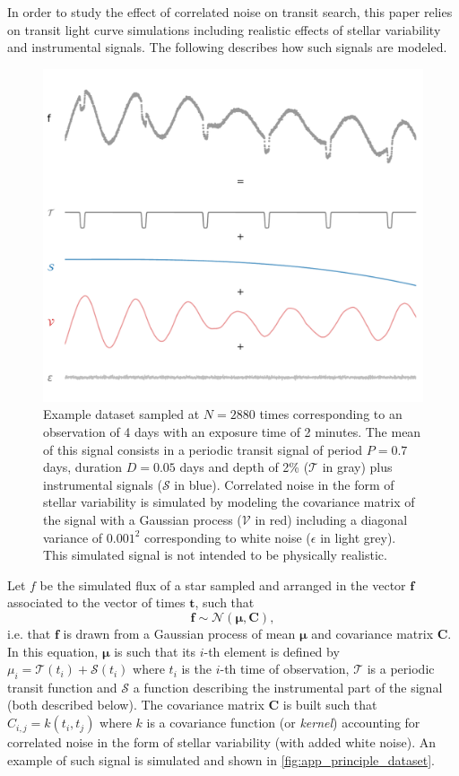 \documentclass{aastex631}
\begin{document}
In order to study the effect of correlated noise on transit search, this paper relies on transit light curve simulations including realistic effects of stellar variability and instrumental signals. The following describes how such signals are modeled.
\begin{figure}[H]
    \begin{centering}
        \includegraphics[width=0.75\linewidth]{principle_dataset_decomposed.pdf}
        \caption{Example dataset sampled at $N=2880$ times corresponding to an observation of 4 days with an exposure time of 2 minutes. The mean of this signal consists in a periodic transit signal of period $P=0.7$ days, duration $D=0.05$ days and depth of 2\% ($\mathcal{T}$ in gray) plus instrumental signals ($\mathcal{S}$ in blue). Correlated noise in the form of stellar variability is simulated by modeling the covariance matrix of the signal with a Gaussian process ($\mathcal{V}$ in red) including a diagonal variance of $0.001^2$ corresponding to white noise ($\epsilon$ in light grey). This simulated signal is not intended to be physically realistic.}
        \label{fig:app_principle_dataset}
    \end{centering}
\end{figure}
\noindent Let $f$ be the simulated flux of a star sampled and arranged in the vector $\bm{f}$ associated to the vector of times $\bm{t}$, such that
\begin{equation*}
    \bm{f} \sim \mathcal{N}(\bm{\mu}, \bm{C}),
\end{equation*}
i.e. that $\bm{f}$ is drawn from a Gaussian process of mean $\bm{\mu}$ and covariance matrix $\bm{C}$. In this equation, $\bm{\mu}$ is such that its $i$-th element is defined by  $\mu_i = \mathcal{T}(t_i) + \mathcal{S}(t_i)$ where $t_i$ is the $i$-th time of observation, $\mathcal{T}$ is a periodic transit function and $\mathcal{S}$ a function describing the instrumental part of the signal (both described below). The covariance matrix $\bm{C}$ is built such that $C_{i, j} = k(t_i, t_j)$ where $k$ is a covariance function (or \textit{kernel}) accounting for correlated noise in the form of stellar variability (with added white noise). An example of such signal is simulated and shown in \autoref{fig:app_principle_dataset}.
\end{document}

